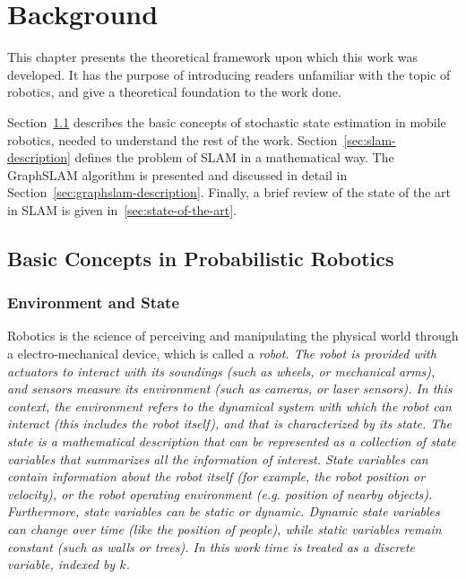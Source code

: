 \chapter{Background}
\label{chap:antecedents}

This chapter presents the theoretical framework upon which this work was developed. It has the purpose of introducing readers unfamiliar with the topic of robotics, and give a theoretical foundation to the work done.

Section~\ref{sec:basic-concepts} describes the basic concepts of stochastic state estimation in mobile robotics, needed to understand the rest of the work. Section~\ref{sec:slam-description} defines the problem of SLAM in a mathematical way. The GraphSLAM algorithm is presented and discussed in detail in Section~\ref{sec:graphslam-description}. Finally, a brief review of the state of the art in SLAM is given in~\ref{sec:state-of-the-art}.

\section{Basic Concepts in Probabilistic Robotics} 
\label{sec:basic-concepts}

\subsection{Environment and State}

Robotics is the science of perceiving and manipulating the physical world through a electro-mechanical device, which is called a \it{robot}. The robot is provided with actuators to interact with its soundings (such as wheels, or mechanical arms), and sensors measure its environment (such as cameras, or laser sensors). In this context, the \it{environment} refers to the dynamical system with which the robot can interact (this includes the robot itself), and that is characterized by its \it{state}. The state is a mathematical description that can be represented as a collection of \it{state variables} that summarizes all the information of interest. State variables can contain information about the robot itself (for example, the robot position or velocity), or the robot operating environment (e.g. position of nearby objects). Furthermore, state variables can be \it{static} or \it{dynamic}. Dynamic state variables can change over time (like the position of people), while static variables remain constant (such as walls or trees). In this work time is treated as a discrete variable, indexed by $k$.

